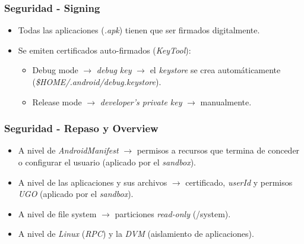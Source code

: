 \begin{frame}
  \frametitle{Seguridad - Signing}
  \begin{itemize}
    \item Todas las aplicaciones (\textit{.apk}) tienen que ser firmados digitalmente.

    \item Se emiten certificados auto-firmados (\textit{KeyTool}):
    \begin{itemize}
  \item Debug mode $\rightarrow$ \textit{debug key} $\rightarrow$ el \textit{keystore} se crea automáticamente (\textit{\$HOME/.android/debug.keystore}).
  
  \item Release mode $\rightarrow$ \textit{developer's private key} $\rightarrow$ manualmente.
    \end{itemize}    
  \end{itemize}
\end{frame}

\begin{frame}
  \frametitle{Seguridad - Repaso y Overview}
  \begin{itemize}
   \item A nivel de \textit{AndroidManifest} $\rightarrow$ permisos a recursos que termina de conceder o configurar el usuario (aplicado por el \textit{sandbox}).
   
   \item A nivel de las aplicaciones y sus archivos $\rightarrow$ certificado, \textit{userId} y permisos \textit{UGO} (aplicado por el \textit{sandbox}).
   
   \item A nivel de file system $\rightarrow$ particiones \textit{read-only} (/system).
   
   \item A nivel de \textit{Linux} (\textit{RPC}) y la \textit{DVM} (aislamiento de aplicaciones).
  \end{itemize}
\end{frame}

